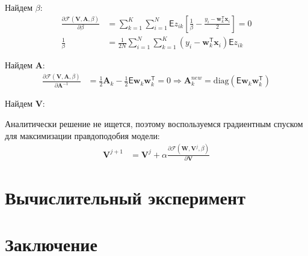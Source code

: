 \documentclass[12pt, twoside]{article}
\numberwithin{equation}{section}
\begin{document}
Найдем $\beta$:
\begin{equation}
\label{eq:st:21}
\begin{aligned}
\frac{\partial \mathcal{F}\left(\textbf{V}, \textbf{A}, \beta\right)}{\partial \beta} &= \sum_{k=1}^{K}\sum_{i=1}^{N}\mathsf{E}z_{ik}\left[\frac{1}{\beta} - \frac{y_i - \textbf{w}_{k}^{\mathsf{T}}\textbf{x}_{i}}{2}\right] = 0\\
\frac{1}{\beta} &= \frac{1}{2N}\sum_{i=1}^{N}\sum_{k=1}^{K}\left(y_{i}-\textbf{w}_{k}^{\mathsf{T}}\textbf{x}_{i}\right)\mathsf{E}z_{ik}
\end{aligned}
\end{equation}

Найдем $\textbf{A}$:
\begin{equation}
\label{eq:st:22}
\begin{aligned}
\frac{\partial \mathcal{F}\left(\textbf{V}, \textbf{A}, \beta\right)}{\partial \textbf{A}^{-1}  }&= \frac{1}{2}\textbf{A}_{k} - \frac{1}{2}\mathsf{E}\textbf{w}_{k}\textbf{w}_{k}^{\mathsf{T}} = 0 \Rightarrow \textbf{A}_{k}^{new} = \text{diag}\left(\mathsf{E}\textbf{w}_{k}\textbf{w}_{k}^{\mathsf{T}}\right)
\end{aligned}
\end{equation}


Найдем $\textbf{V}$:

Аналитически решение не ищется, поэтому воспользуемся градиентным спуском для максимизации правдоподобия модели:
\begin{equation}
\label{eq:st:23}
\begin{aligned}
\textbf{V}^{j+1} &= \textbf{V}^{j} + \alpha\frac{\partial \mathcal{F}\left(\textbf{W}, \textbf{V}^{j}, \beta\right)}{\partial \textbf{V}} 
\end{aligned}
\end{equation}


\section{Вычислительный эксперимент}

\section{Заключение}

\begin{thebibliography}{99}

\end{thebibliography}
\end{document}

